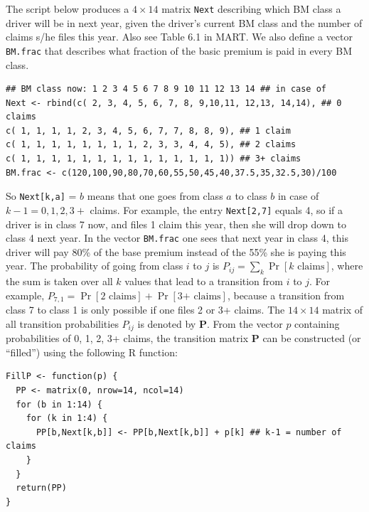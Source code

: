 \documentclass{article}
\begin{document}
The script below produces a $4 \times 14$ matrix \texttt{Next} describing which BM class a driver will be in next year, given the driver's current BM class and the number of claims s/he files this year. Also see Table 6.1 in MART. We also define a vector \texttt{BM.frac} that describes what fraction of the basic premium is paid in every BM class.
 
\begin{lstlisting}
## BM class now: 1 2 3 4 5 6 7 8 9 10 11 12 13 14 ## in case of
Next <- rbind(c( 2, 3, 4, 5, 6, 7, 8, 9,10,11, 12,13, 14,14), ## 0 claims
c( 1, 1, 1, 1, 2, 3, 4, 5, 6, 7, 7, 8, 8, 9), ## 1 claim
c( 1, 1, 1, 1, 1, 1, 1, 1, 2, 3, 3, 4, 4, 5), ## 2 claims
c( 1, 1, 1, 1, 1, 1, 1, 1, 1, 1, 1, 1, 1, 1)) ## 3+ claims
BM.frac <- c(120,100,90,80,70,60,55,50,45,40,37.5,35,32.5,30)/100
\end{lstlisting} 
So \texttt{Next[k,a]} = $b$ means that one goes from class $a$ to class $b$ in case of $k-1 = 0,1,2,3+$ claims. For example, the entry \texttt{Next[2,7]} equals 4, so if a driver is in class 7 now, and files 1 claim this year, then she will drop down to class 4 next year. In the vector \texttt{BM.frac} one sees that next year in class 4, this driver will pay 80\% of the base premium instead of the 55\% she is paying this year. \newline
The probability of going from class $i$ to $j$ is $P_{ij} = \sum_k \Pr[\text{$k$ claims}]$, where the sum is taken over all $k$ values that lead to a transition from $i$ to $j$. For example, $P_{7,1} = \Pr[\text{2 claims}] + \Pr[\text{3+ claims}]$, because a transition from class 7 to class 1 is only possible if one files 2 or 3+ claims. The $14 \times 14$ matrix of all transition probabilities $P_{ij}$ is denoted by $\mathbf{P}$. From the vector $p$ containing probabilities of 0, 1, 2, 3+ claims, the transition matrix $\mathbf{P}$ can be constructed (or ``filled'') using the following R function:
 
\begin{lstlisting}
FillP <- function(p) {
  PP <- matrix(0, nrow=14, ncol=14)
  for (b in 1:14) {
    for (k in 1:4) {
      PP[b,Next[k,b]] <- PP[b,Next[k,b]] + p[k] ## k-1 = number of claims
    }
  }
  return(PP)
}
\end{lstlisting}
 
\end{document}
